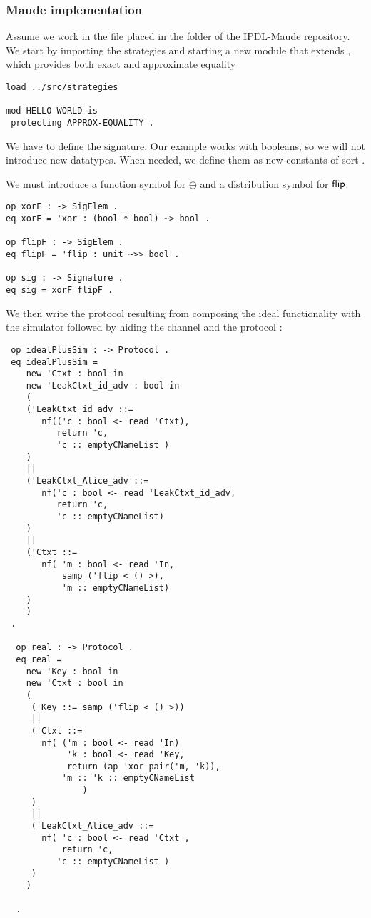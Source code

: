 \subsubsection{Maude implementation}

Assume we work in the file  placed in the 
 folder of the IPDL-Maude repository. We start by importing
the strategies and starting a new module that extends , which provides both exact and approximate equality
\begin{lstlisting}
load ../src/strategies

mod HELLO-WORLD is
 protecting APPROX-EQUALITY .

\end{lstlisting}

We have to define the signature.
Our example works with booleans, 
so we will not introduce new datatypes. 
When needed, we define them as new constants of sort .

We must introduce a function symbol for $\oplus$ and 
a distribution symbol for $\mathsf{flip}$:
\begin{lstlisting}
op xorF : -> SigElem .
eq xorF = 'xor : (bool * bool) ~> bool .

op flipF : -> SigElem .
eq flipF = 'flip : unit ~>> bool .

op sig : -> Signature .
eq sig = xorF flipF .
\end{lstlisting}
We then write the protocol resulting from composing the ideal functionality
with the simulator followed by hiding the channel 
and the protocol :
\begin{lstlisting}
 op idealPlusSim : -> Protocol .
 eq idealPlusSim = 
    new 'Ctxt : bool in
    new 'LeakCtxt_id_adv : bool in
    (
    ('LeakCtxt_id_adv ::= 
       nf(('c : bool <- read 'Ctxt),
          return 'c,
          'c :: emptyCNameList )
    )  
    ||
    ('LeakCtxt_Alice_adv ::= 
       nf('c : bool <- read 'LeakCtxt_id_adv,
          return 'c, 
          'c :: emptyCNameList)
    )
    ||
    ('Ctxt ::= 
       nf( 'm : bool <- read 'In,
           samp ('flip < () >),
           'm :: emptyCNameList)
    )
    )
 .
 
  op real : -> Protocol .
  eq real = 
    new 'Key : bool in
    new 'Ctxt : bool in
    (
     ('Key ::= samp ('flip < () >))
     || 
     ('Ctxt ::= 
       nf( ('m : bool <- read 'In)
            'k : bool <- read 'Key,
            return (ap 'xor pair('m, 'k)),
           'm :: 'k :: emptyCNameList
               )
     )
     ||
     ('LeakCtxt_Alice_adv ::= 
       nf( 'c : bool <- read 'Ctxt ,
           return 'c,
          'c :: emptyCNameList )  
     )
    ) 
         
  .
\end{lstlisting}

